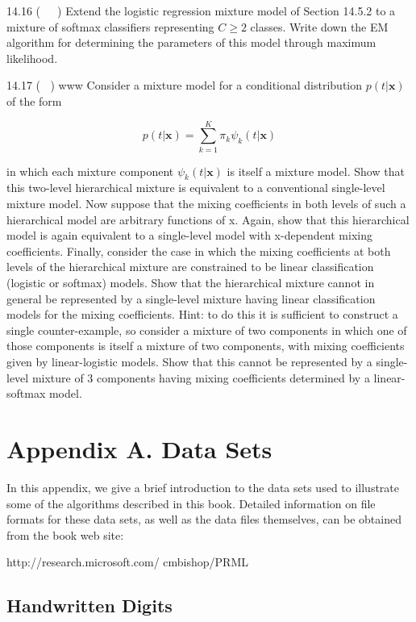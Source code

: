 \documentclass[
  10
]{article}
\begin{document}
14.16 (  ) Extend the logistic regression mixture model of Section
14.5.2 to a mixture of softmax classifiers representing
\(C \geqslant 2\) classes. Write down the EM algorithm for determining
the parameters of this model through maximum likelihood.

14.17 ( ) www Consider a mixture model for a conditional distribution
\(p ( t | \mathbf { x } )\) of the form

\[
p (t | \mathbf {x}) = \sum_ {k = 1} ^ {K} \pi_ {k} \psi_ {k} (t | \mathbf {x})\tag{14.58}
\]

in which each mixture component \(\psi _ { k } ( t | \mathbf x )\) is
itself a mixture model. Show that this two-level hierarchical mixture is
equivalent to a conventional single-level mixture model. Now suppose
that the mixing coefficients in both levels of such a hierarchical model
are arbitrary functions of x. Again, show that this hierarchical model
is again equivalent to a single-level model with x-dependent mixing
coefficients. Finally, consider the case in which the mixing
coefficients at both levels of the hierarchical mixture are constrained
to be linear classification (logistic or softmax) models. Show that the
hierarchical mixture cannot in general be represented by a single-level
mixture having linear classification models for the mixing coefficients.
Hint: to do this it is sufficient to construct a single counter-example,
so consider a mixture of two components in which one of those components
is itself a mixture of two components, with mixing coefficients given by
linear-logistic models. Show that this cannot be represented by a
single-level mixture of 3 components having mixing coefficients
determined by a linear-softmax model.

\section{Appendix A. Data Sets}\label{appendix-a.-data-sets}

In this appendix, we give a brief introduction to the data sets used to
illustrate some of the algorithms described in this book. Detailed
information on file formats for these data sets, as well as the data
files themselves, can be obtained from the book web site:

http://research.microsoft.com/ cmbishop/PRML

\subsection{Handwritten Digits}\label{handwritten-digits}
\end{document}
